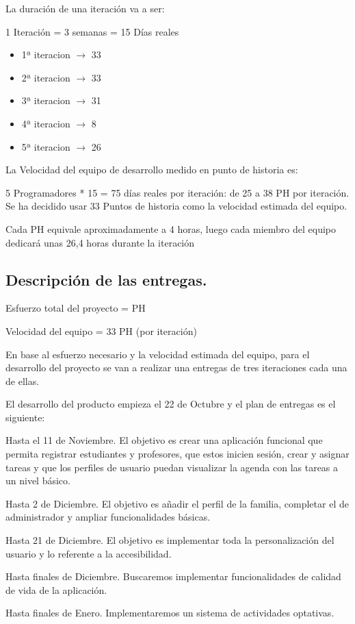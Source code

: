 La duración de una iteración va a ser:
\begin{center}
1 Iteración = 3 semanas = 15 Días reales
\end{center}

\begin{itemize}
    \item 1ª iteracion $\rightarrow$ 33  
    \item 2ª iteracion $\rightarrow$ 33
    \item 3ª iteracion $\rightarrow$ 31
    \item 4ª iteracion $\rightarrow$ 8
    \item 5ª iteracion $\rightarrow$ 26
\end{itemize}

La Velocidad del equipo de desarrollo medido en punto de historia es:
\begin{center}
5 Programadores * 15 = 75 días reales por iteración: de 25 a 38 PH por iteración. Se ha decidido usar 33 Puntos de historia como la velocidad estimada del equipo.
\end{center}

Cada PH equivale aproximadamente a 4 horas, luego cada miembro del equipo dedicará unas 26,4 horas durante la iteración

\subsection{Descripción de las entregas.}

Esfuerzo total del proyecto =  PH 

Velocidad del equipo = 33 PH (por iteración) 

En base al esfuerzo necesario y la velocidad estimada del equipo, para el desarrollo del proyecto se van a realizar una entregas de tres iteraciones cada  una de ellas. 

El desarrollo del producto empieza el 22 de Octubre y el plan de entregas es el siguiente:

\begin{description}[font=\normalfont, style=multiline, leftmargin=3.2cm]
    \item[{Iteración 1:}] Hasta el 11 de Noviembre. El objetivo es crear una aplicación funcional que permita registrar estudiantes y profesores, que estos inicien sesión, crear y asignar tareas y que los perfiles de usuario puedan visualizar la agenda con las tareas a un nivel básico.
    \item[{Iteración 2:}] Hasta 2 de Diciembre. El objetivo es añadir el perfil de la familia, completar el de administrador y ampliar funcionalidades básicas.
    \item[{Iteración 3:}] Hasta 21 de Diciembre. El objetivo es implementar toda la personalización del usuario y lo referente a la accesibilidad.
    \item[{Iteración 4:}] Hasta finales de Diciembre. Buscaremos implementar funcionalidades de calidad de vida de la aplicación.
    \item[{Iteración 5:}] Hasta finales de Enero. Implementaremos un sistema de actividades optativas.
\end{description}
